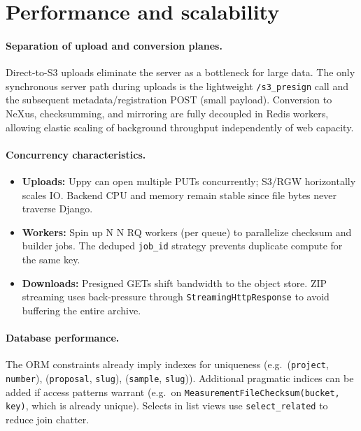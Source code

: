 
\section{Performance and scalability}\label{sec:performance}

\paragraph{Separation of upload and conversion planes.}
Direct-to-S3 uploads eliminate the server as a bottleneck for large data. The only synchronous server path during uploads is the lightweight \texttt{/s3\_presign} call and the subsequent metadata/registration POST (small payload). Conversion to NeXus, checksumming, and mirroring are fully decoupled in Redis workers, allowing elastic scaling of background throughput independently of web capacity.

\paragraph{Concurrency characteristics.}
\begin{itemize}
	\item \textbf{Uploads:} Uppy can open multiple PUTs concurrently; S3/RGW horizontally scales IO. Backend CPU and memory remain stable since file bytes never traverse Django.
	\item \textbf{Workers:} Spin up 
	N
	N RQ workers (per queue) to parallelize checksum and builder jobs. The deduped \texttt{job\_id} strategy prevents duplicate compute for the same key.
	\item \textbf{Downloads:} Presigned GETs shift bandwidth to the object store. ZIP streaming uses back-pressure through \texttt{StreamingHttpResponse} to avoid buffering the entire archive.
\end{itemize}

\paragraph{Database performance.}
The ORM constraints already imply indexes for uniqueness (e.g.\ (\texttt{project}, \texttt{number}), (\texttt{proposal}, \texttt{slug}), (\texttt{sample}, \texttt{slug})). Additional pragmatic indices can be added if access patterns warrant (e.g.\ on \texttt{MeasurementFileChecksum(bucket, key)}, which is already unique). Selects in list views use \texttt{select\_related} to reduce join chatter.

